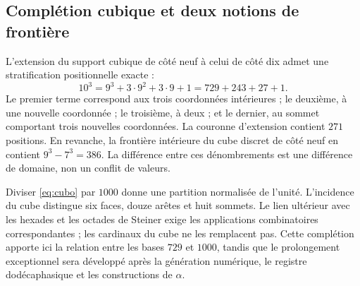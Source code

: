 \subsection{Complétion cubique et deux notions de frontière}

L’extension du support cubique de côté neuf à celui de côté dix admet une stratification positionnelle exacte :
\begin{equation}
 10^3=9^3+3\cdot9^2+3\cdot9+1=729+243+27+1.
 \label{eq:cubo}
\end{equation}
Le premier terme correspond aux trois coordonnées intérieures ; le deuxième, à une nouvelle coordonnée ; le troisième, à deux ; et le dernier, au sommet comportant trois nouvelles coordonnées. La couronne d’extension contient \(271\) positions. En revanche, la frontière intérieure du cube discret de côté neuf en contient \(9^3-7^3=386\). La différence entre ces dénombrements est une différence de domaine, non un conflit de valeurs.

Diviser \eqref{eq:cubo} par \(1000\) donne une partition normalisée de l’unité. L’incidence du cube distingue six faces, douze arêtes et huit sommets. Le lien ultérieur avec les hexades et les octades de Steiner exige les applications combinatoires correspondantes ; les cardinaux du cube ne les remplacent pas. Cette complétion apporte ici la relation entre les bases \(729\) et \(1000\), tandis que le prolongement exceptionnel sera développé après la génération numérique, le registre dodécaphasique et les constructions de \(\alpha\).





